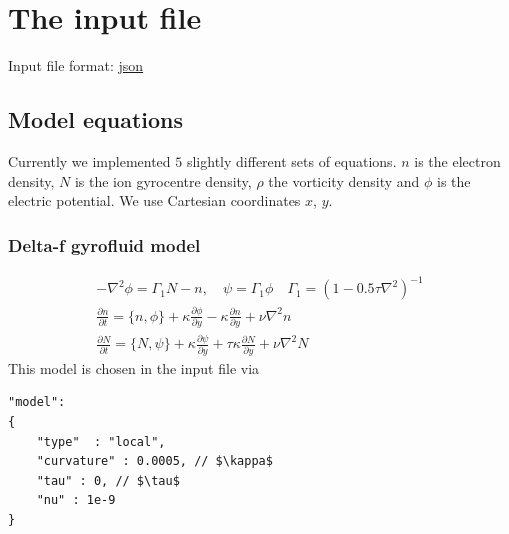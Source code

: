 \section{The input file}
Input file format: \href{https://en.wikipedia.org/wiki/JSON}{json}

\subsection{Model equations}
Currently we implemented $5$ slightly different sets of equations. $n$ is the electron density, $N$ is the ion gyrocentre density, $\rho$
the vorticity density and $\phi$ is the electric potential. We
use Cartesian coordinates $x$, $y$.

\subsubsection{Delta-f gyrofluid model}
\begin{subequations}
\begin{align}
 -\nabla^2 \phi =  \Gamma_1 N -n, \quad
\psi = \Gamma_1 \phi \quad \Gamma_1 = ( 1- 0.5\tau\nabla^2)^{-1} \\
 \frac{\partial n}{\partial t}     =
    \{ n, \phi\}
  + \kappa \frac{\partial \phi}{\partial y}
  -\kappa \frac{\partial n}{\partial y}
  + \nu \nabla^2 n  \\
  \frac{\partial N}{\partial t} =
  \{ N, \psi\}
  + \kappa \frac{\partial \psi}{\partial y}
  + \tau \kappa\frac{\partial N}{\partial y} +\nu\nabla^2N
\end{align}
\end{subequations}
This model is chosen in the input file via
\begin{verbatim}
"model":
{
    "type"  : "local",
    "curvature" : 0.0005, // $\kappa$
    "tau" : 0, // $\tau$
    "nu" : 1e-9
}
\end{verbatim}

